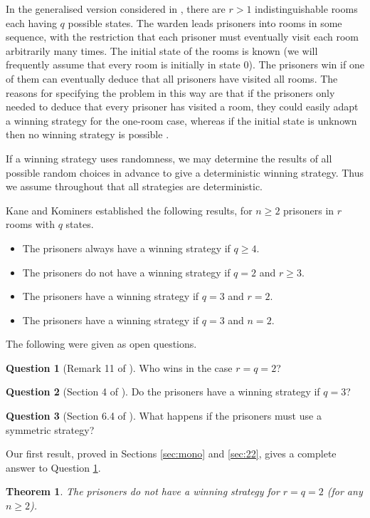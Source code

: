 \documentclass[a4paper,11pt]{extarticle}
\newtheorem{theorem}{Theorem}
\theoremstyle{definition}
\newtheorem{question}{Question}
\theoremstyle{remark}
\begin{document}
	In the generalised version considered in \cite{KK21}, there are $r>1$ indistinguishable 
	rooms each having $q$ possible states.
	The warden leads prisoners into rooms in some sequence, with the restriction that each prisoner must eventually visit each room arbitrarily many times. The initial state of the rooms is known (we will frequently assume that every room is initially in state $0$). The prisoners win if one of them can eventually deduce that all prisoners have visited all rooms. The reasons for specifying the problem in this way are that if the prisoners only needed to deduce that every prisoner has visited a room, they could easily adapt a winning strategy for the one-room case, whereas if the initial state is unknown then no winning strategy is possible \cite{KK21}.
	
	If a winning strategy uses randomness, we may determine the results of all possible random choices in advance to give a deterministic winning strategy. Thus we assume throughout that all strategies are deterministic.
	
	Kane and Kominers \cite{KK21} established the following results, for $n\geq 2$ prisoners in $r$ rooms with $q$ states.
	\begin{itemize}
		\item The prisoners always have a winning strategy if $q\geq 4$.
		\item The prisoners do not have a winning strategy if $q=2$ and $r\geq 3$.
		\item The prisoners have a winning strategy if $q=3$ and $r=2$.
		\item The prisoners have a winning strategy if $q=3$ and $n=2$.
	\end{itemize}
	The following were given as open questions.
	\begin{question}[Remark 11 of \cite{KK21}]\label{qu:22}Who wins in the case $r=q=2$?\end{question}
	\begin{question}[Section 4 of \cite{KK21}]\label{qu:r3}Do the prisoners have a winning strategy if $q=3$?\end{question}
	\begin{question}[Section 6.4 of \cite{KK21}]\label{qu:sym}What happens if the prisoners must use a symmetric
		strategy?\end{question}
	
	Our first result, proved in Sections \ref{sec:mono} and \ref{sec:22}, gives a complete answer to Question \ref{qu:22}.
	\begin{theorem}\label{thm:22}
		The prisoners do not have a winning strategy for $r=q=2$ (for any $n\geq 2$).
	\end{theorem}
	
\end{document}
